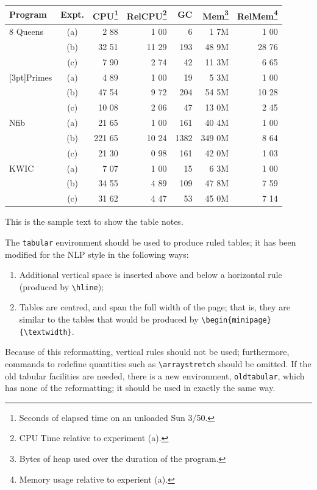 \documentclass{CUP-JNL-NLP}
\begin{document}
\begin{table}[h!]
 {\tablefont\begin{minipage}{25pc}
    \begin{tabular}{@{\extracolsep{\fill}}lcrrrrr}
    \hline
    Program& Expt.&
     CPU\footnote{Seconds of elapsed time on an unloaded Sun 3/50.}&
     RelCPU\footnote{CPU Time relative to experiment (a).}&
     GC& Mem\footnote{Bytes of heap used over the duration of the program.}&
     RelMem\footnote{Memory usage relative to experient (a).}\\
    \hline
    8 Queens& (a)&   2 88&  1 00&    6&   1 7M&  1 00\\\hdashline
    &         (b)&  32 51& 11 29&  193&  48 9M& 28 76\\\hdashline
    &         (c)&   7 90&  2 74&   42&  11 3M&  6 65\\\hdashline
    \multirow{4}{*}[3pt]{Primes}&   (a)&   4 89&  1 00&   19&   5 3M&  1 00\\\hdashline
    &         (b)&  47 54&  9 72&  204&  54 5M& 10 28\\\hdashline
    &         (c)&  10 08&  2 06&   47&  13 0M&  2 45\\\hdashline
    Nfib&     (a)&  21 65&  1 00&  161&  40 4M&  1 00\\\hdashline
    &         (b)& 221 65& 10 24& 1382& 349 0M&  8 64\\\hdashline
    &         (c)&  21 30&  0 98&  161&  42 0M&  1 03\\\hdashline
    KWIC&     (a)&   7 07&  1 00&   15&   6 3M&  1 00\\\hdashline
    &         (b)&  34 55&  4 89&  109&  47 8M&  7 59\\\hdashline
    &         (c)&  31 62&  4 47&   53&  45 0M&  7 14\\
    \hline
    \end{tabular}
  \end{minipage}}
  {\begin{tabnote}
  This is the sample text to show the table notes.
  \end{tabnote}}
  \label{sample-table}
\end{table}

The \verb"tabular" environment should be used to produce ruled tables;
it has been modified for the NLP style in the following ways:
\begin{enumerate}
  \item Additional vertical space is inserted above and below a horizontal rule
        (produced by \verb"\hline");
  \item Tables are centred, and span the full width of the page; that is,
  they are similar to the tables that would be produced by
  \verb"\begin{minipage}" \verb"{\textwidth}".
\end{enumerate}
Because of this reformatting, vertical rules should not be used;
furthermore, commands to
redefine quantities such as \verb"\arraystretch" should be omitted. If
the old tabular facilities are needed, there is a new environment,
\verb"oldtabular", which has none of the reformatting; it should be used
in exactly the same way.
\end{document}
